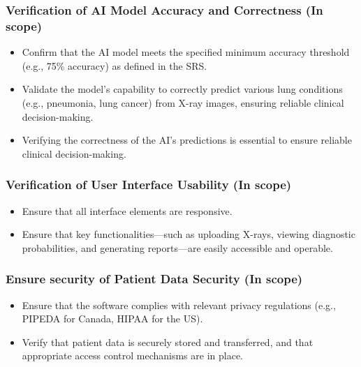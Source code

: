 \documentclass[12pt, titlepage]{article}
\begin{document}
    \subsubsection{Verification of AI Model Accuracy and Correctness (In scope)}
    \begin{itemize}
        \item[-] Confirm that the AI model meets the specified minimum accuracy threshold (e.g., 75\% accuracy) as defined in the SRS.
        \item[-] Validate the model's capability to correctly predict various lung conditions (e.g., pneumonia, lung cancer) from X-ray images, ensuring reliable clinical decision-making.
        \item[-] Verifying the correctness of the AI's predictions is essential to ensure reliable clinical decision-making.
    \end{itemize}
    
    \subsubsection{Verification of User Interface Usability (In scope)}
    \begin{itemize}
        \item[-] Ensure that all interface elements are responsive.
        \item[-] Ensure that key functionalities—such as uploading X-rays, viewing diagnostic probabilities, and generating reports—are easily accessible and operable.
        
        
    \end{itemize}
    
    \subsubsection{Ensure security of Patient Data Security (In scope)}
    \begin{itemize}
        \item[-] Ensure that the software complies with relevant privacy regulations (e.g., PIPEDA for Canada, HIPAA for the US).
        \item[-] Verify that patient data is securely stored and transferred, and that appropriate access control mechanisms are in place.

    \end{itemize}
    
\end{document}

